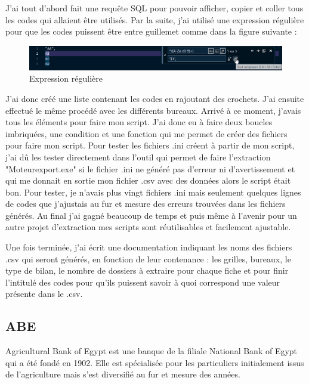 J'ai tout d'abord fait une requête SQL pour pouvoir afficher, copier et coller tous les codes qui allaient être utilisés. Par la suite, j'ai utilisé une expression régulière pour que les codes puissent être entre guillemet comme dans la figure suivante :


\begin{figure}[ht]
\centering
\includegraphics[scale=0.6]{resources/regex.png}
\caption{Expression régulière}
\label{regex}
\end{figure}

J'ai donc créé une liste contenant les codes en rajoutant des crochets. J'ai ensuite effectué le même procédé avec les différents bureaux. Arrivé à ce moment, j'avais tous les éléments pour faire mon script. J'ai donc eu à faire deux boucles imbriquées, une condition et une fonction qui me permet de créer des fichiers pour faire mon script. Pour tester les fichiers .ini créent à partir de mon script, j'ai dû les tester directement dans l'outil qui permet de faire l'extraction "Moteurexport.exe" si le fichier .ini ne généré pas d'erreur ni d'avertissement et qui me donnait en sortie mon fichier .csv avec des données alors le script était bon. Pour tester, je n’avais plus vingt fichiers .ini mais seulement quelques lignes de codes que j'ajustais au fur et mesure des erreurs trouvées dans les fichiers générés. Au final j'ai gagné beaucoup de temps et puis même à l'avenir pour un autre projet d'extraction mes scripts sont réutilisables et facilement ajustable.

Une fois terminée, j'ai écrit une documentation indiquant les noms des fichiers .csv qui seront générés, en fonction de leur contenance : les grilles, bureaux, le type de bilan, le nombre de dossiers à extraire pour chaque fiche et pour finir l'intitulé des codes pour qu'ils puissent savoir à quoi correspond une valeur présente dans le .csv.

\subsection{ABE}

Agricultural Bank of Egypt est une banque de la filiale National Bank of Egypt qui a été fondé en 1902.
Elle est spécialisée pour les particuliers initialement issus de l'agriculture mais s'est diversifié au fur et mesure des années.\\

